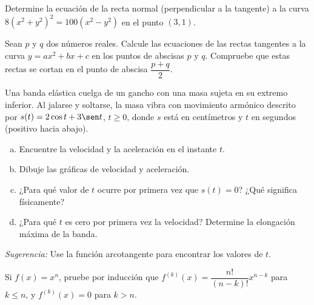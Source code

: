 \begin{prob}
Determine la ecuación de la recta normal (perpendicular a la tangente)
a la curva $8(x^2+y^2)^2=100(x^2-y^2)$ en el punto $(3,1)$.
\end{prob}

\begin{prob}
Sean $p$ y $q$ dos números reales. Calcule las ecuaciones de las rectas
tangentes a la curva $y=ax^2+bx+c$ en los puntos de abscisas $p$ y $q$.
Compruebe que estas rectas se cortan en el punto de abscisa
$\dfrac{p+q}{2}$.
\end{prob}

\begin{prob}
Una banda elástica cuelga de un gancho con una masa sujeta en su extremo
inferior. Al jalarse y soltarse, la masa vibra con movimiento armónico
descrito por $s(t)=2\cos t+3\sen t$, $t\geq 0$, donde $s$ está en
centímetros y $t$ en segundos (positivo hacia abajo).
\begin{enumerate}[(a)]
    \item Encuentre la velocidad y la aceleración en el instante $t$.
    \item Dibuje las gráficas de velocidad y aceleración.
    \item ¿Para qué valor de $t$ ocurre por primera vez que $s(t)=0$?
    ¿Qué significa físicamente?
    \item ¿Para qué $t$ es cero por primera vez la velocidad?
    Determine la elongación máxima de la banda.
\end{enumerate}
\textit{Sugerencia:} Use la función arcotangente para encontrar los
valores de $t$.
\end{prob}

\begin{prob}
Si $f(x) = x^n$, pruebe por inducción que $f^{(k)}(x) = \dfrac{n!}{(n-k)!}x^{n-k}$
para $k \leq n$, y $f^{(k)}(x) = 0$ para $k > n$.
\end{prob}

